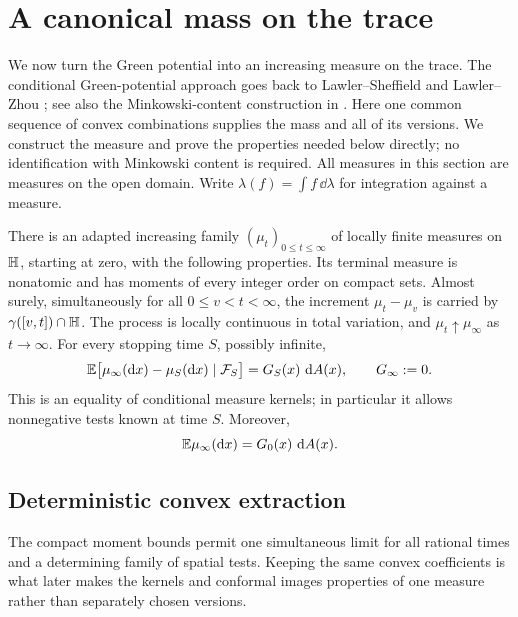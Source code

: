 \section{A canonical mass on the trace}
\label{mass:section}

We now turn the Green potential into an increasing measure on the trace.
The conditional Green-potential approach goes back to
Lawler--Sheffield \cite[Proposition~2.2 and Section~3]{LawlerSheffield2011}
and Lawler--Zhou \cite[Proposition~A and Theorem~1]{LawlerZhou2013};
see also the Minkowski-content construction in \cite{LawlerRezaei2015}.
Here one common sequence of convex combinations supplies the mass and
all of its versions. We construct the measure and prove the
properties needed below directly; no identification with Minkowski content
is required.  All measures in this section are measures on the open domain.
Write $\lambda(f)=\int f\,\dd\lambda$ for integration against a measure.

\begin{proposition}
\label{mass:construction}
There is an adapted increasing family $(\mu_t)_{0\le t\le\infty}$ of
locally finite measures on $\mathbb H$, starting at zero, with the following
properties.  Its terminal measure is nonatomic and has moments of every
integer order on compact sets.  Almost surely, simultaneously for all
$0\le v<t<\infty$, the increment $\mu_t-\mu_v$ is carried by
$\gamma([v,t])\cap\mathbb H$.  The process is locally continuous in total
variation, and $\mu_t\uparrow\mu_\infty$ as $t\to\infty$.
For every stopping time $S$, possibly infinite,
\begin{equation}
 \mathbb E\bigl[\mu_\infty(\mathop{}\!\mathrm{d} x)-\mu_S(\mathop{}\!\mathrm{d} x)\mid\mathcal F_S\bigr]
   =G_S(x)\,\mathop{}\!\mathrm{d} A(x),
 \qquad G_\infty:=0.
 \label{mass:kernel}
\end{equation}
This is an equality of conditional measure kernels; in particular it
allows nonnegative tests known at time $S$.  Moreover,
\begin{equation}
 \mathbb E\mu_\infty(\mathop{}\!\mathrm{d} x)=G_0(x)\,\mathop{}\!\mathrm{d} A(x).
 \label{mass:mean}
\end{equation}
\end{proposition}

\subsection{Deterministic convex extraction}

The compact moment bounds permit one simultaneous limit for all
rational times and a determining family of spatial tests. Keeping the
same convex coefficients is what later makes the kernels and conformal
images properties of one measure rather than separately chosen versions.

